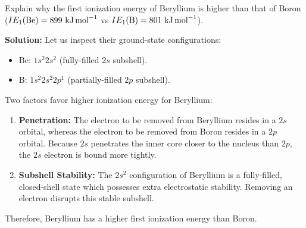 \documentclass[12pt,a4paper]{article}
\begin{document}
\begin{tcolorbox}[examplebox, title={Anomaly 1: Beryllium ($Z=4$) vs. Boron ($Z=5$)}]
  Explain why the first ionization energy of Beryllium is higher than that of Boron ($IE_1(\text{Be}) = 899\ \text{kJ\,mol}^{-1}$ vs $IE_1(\text{B}) = 801\ \text{kJ\,mol}^{-1}$).
  \par\vspace{4pt}
  \textbf{Solution:}
  Let us inspect their ground-state configurations:
  \begin{itemize}[leftmargin=1cm, itemsep=2pt]
    \item $\text{Be}$: $1s^2 2s^2$ (fully-filled $2s$ subshell).
    \item $\text{B}$: $1s^2 2s^2 2p^1$ (partially-filled $2p$ subshell).
  \end{itemize}
  Two factors favor higher ionization energy for Beryllium:
  \begin{enumerate}
    \item \textbf{Penetration:} The electron to be removed from Beryllium resides in a $2s$ orbital, whereas the electron to be removed from Boron resides in a $2p$ orbital. Because $2s$ penetrates the inner core closer to the nucleus than $2p$, the $2s$ electron is bound more tightly.
    \item \textbf{Subshell Stability:} The $2s^2$ configuration of Beryllium is a fully-filled, closed-shell state which possesses extra electrostatic stability. Removing an electron disrupts this stable subshell.
  \end{enumerate}
  Therefore, Beryllium has a higher first ionization energy than Boron.
\end{tcolorbox}
\end{document}
